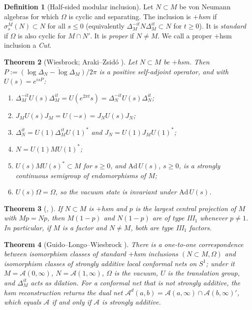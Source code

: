 \documentclass[12pt]{article}
\newtheorem{theorem}{Theorem}[section]
\theoremstyle{definition}
\newtheorem{definition}[theorem]{Definition}
\theoremstyle{remark}
\begin{document}
\begin{definition}[Half-sided modular inclusion]\label{def:hsm}
Let \(N\subset M\) be von Neumann algebras for which \(\Omega\) is cyclic and
separating. The inclusion is \emph{\(+\)hsm} if \(\sigma^M_s(N)\subset N\) for all
\(s\le0\) (equivalently \(\Delta_M^{-it}N\Delta_M^{it}\subset N\) for \(t\ge0\)). It
is \emph{standard} if \(\Omega\) is also cyclic for \(M\cap N'\). It is \emph{proper}
if \(N\ne M\). We call a proper \(+\)hsm inclusion a \emph{Cut}.
\end{definition}

\begin{theorem}[Wiesbrock; Araki--Zsid\'o {\cite[Thm.~2.1]{AZ}}]\label{thm:AZ}
Let \(N\subset M\) be \(+\)hsm. Then \(P:=\overline{(\log\Delta_N-\log\Delta_M)/2\pi}\)
is a positive self-adjoint operator, and with \(U(s)=e^{isP}\):
\begin{enumerate}[label=(\arabic*),leftmargin=2em,itemsep=1pt]
\item \(\Delta_M^{-it}U(s)\Delta_M^{it}=U(e^{2\pi t}s)=\Delta_N^{-it}U(s)\Delta_N^{it}\);
\item \(J_MU(s)J_M=U(-s)=J_NU(s)J_N\);
\item \(\Delta_N^{it}=U(1)\Delta_M^{it}U(1)^*\) and \(J_N=U(1)J_MU(1)^*\);
\item \(N=U(1)MU(1)^*\);
\item \(U(s)MU(s)^*\subset M\) for \(s\ge0\), and \(\mathrm{Ad}\,U(s)\), \(s\ge0\), is
a strongly continuous semigroup of endomorphisms of \(M\);
\item \(U(s)\Omega=\Omega\), so the vacuum state is invariant under \(\mathrm{Ad}\,U(s)\).
\end{enumerate}
\end{theorem}

\begin{theorem}[{\cite[Thm.~2.2(4)]{AZ}}, {\cite[Cor.~1.8]{GLW}}]\label{thm:type}
If \(N\subset M\) is \(+\)hsm and \(p\) is the largest central projection of \(M\)
with \(Mp=Np\), then \(M(1-p)\) and \(N(1-p)\) are of type III\(_1\) whenever
\(p\ne1\). In particular, if \(M\) is a factor and \(N\ne M\), both are type III\(_1\)
factors.
\end{theorem}

\begin{theorem}[Guido--Longo--Wiesbrock {\cite[Cor.~1.7--1.9]{GLW}}]\label{thm:GLW}
There is a one-to-one correspondence between isomorphism classes of
\emph{standard} \(+\)hsm inclusions \((N\subset M,\Omega)\) and isomorphism
classes of strongly additive local conformal nets on \(S^1\); under it
\(M=\mathcal A(0,\infty)\), \(N=\mathcal A(1,\infty)\), \(\Omega\) is the vacuum,
\(U\) is the translation group, and \(\Delta_M^{it}\) acts as dilation. For a
conformal net that is not strongly additive, the hsm reconstruction returns the
dual net \(\mathcal A^d(a,b)=\mathcal A(a,\infty)\cap\mathcal A(b,\infty)'\), which
equals \(\mathcal A\) if and only if \(\mathcal A\) is strongly additive.
\end{theorem}
\end{document}
